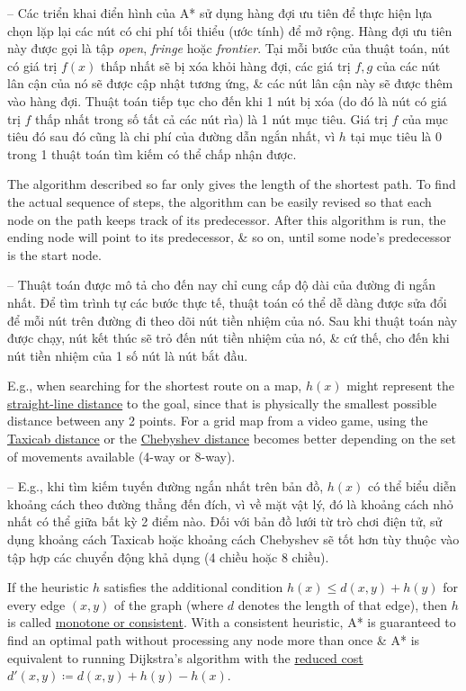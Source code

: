 \documentclass{article}
\begin{document}
-- Các triển khai điển hình của A* sử dụng hàng đợi ưu tiên để thực hiện lựa chọn lặp lại các nút có chi phí tối thiểu (ước tính) để mở rộng. Hàng đợi ưu tiên này được gọi là tập {\it open}, {\it fringe} hoặc {\it frontier}. Tại mỗi bước của thuật toán, nút có giá trị $f(x)$ thấp nhất sẽ bị xóa khỏi hàng đợi, các giá trị $f,g$ của các nút lân cận của nó sẽ được cập nhật tương ứng, \& các nút lân cận này sẽ được thêm vào hàng đợi. Thuật toán tiếp tục cho đến khi 1 nút bị xóa (do đó là nút có giá trị $f$ thấp nhất trong số tất cả các nút rìa) là 1 nút mục tiêu. Giá trị $f$ của mục tiêu đó sau đó cũng là chi phí của đường dẫn ngắn nhất, vì $h$ tại mục tiêu là 0 trong 1 thuật toán tìm kiếm có thể chấp nhận được.

The algorithm described so far only gives the length of the shortest path. To find the actual sequence of steps, the algorithm can be easily revised so that each node on the path keeps track of its predecessor. After this algorithm is run, the ending node will point to its predecessor, \& so on, until some node's predecessor is the start node.

-- Thuật toán được mô tả cho đến nay chỉ cung cấp độ dài của đường đi ngắn nhất. Để tìm trình tự các bước thực tế, thuật toán có thể dễ dàng được sửa đổi để mỗi nút trên đường đi theo dõi nút tiền nhiệm của nó. Sau khi thuật toán này được chạy, nút kết thúc sẽ trỏ đến nút tiền nhiệm của nó, \& cứ thế, cho đến khi nút tiền nhiệm của 1 số nút là nút bắt đầu.

E.g., when searching for the shortest route on a map, $h(x)$ might represent the \href{https://en.wikipedia.org/wiki/Euclidean_distance}{straight-line distance} to the goal, since that is physically the smallest possible distance between any 2 points. For a grid map from a video game, using the \href{https://en.wikipedia.org/wiki/Taxicab_distance}{Taxicab distance} or the \href{https://en.wikipedia.org/wiki/Chebyshev_distance}{Chebyshev distance} becomes better depending on the set of movements available (4-way or 8-way).

-- E.g., khi tìm kiếm tuyến đường ngắn nhất trên bản đồ, $h(x)$ có thể biểu diễn khoảng cách theo đường thẳng đến đích, vì về mặt vật lý, đó là khoảng cách nhỏ nhất có thể giữa bất kỳ 2 điểm nào. Đối với bản đồ lưới từ trò chơi điện tử, sử dụng khoảng cách Taxicab hoặc khoảng cách Chebyshev sẽ tốt hơn tùy thuộc vào tập hợp các chuyển động khả dụng (4 chiều hoặc 8 chiều).

If the heuristic $h$ satisfies the additional condition $h(x)\le d(x,y) + h(y)$ for every edge $(x,y)$ of the graph (where $d$ denotes the length of that edge), then $h$ is called \href{https://en.wikipedia.org/wiki/Consistent_heuristic}{monotone or consistent}. With a consistent heuristic, A* is guaranteed to find an optimal path without processing any node more than once \& A* is equivalent to running Dijkstra's algorithm with the \href{https://en.wikipedia.org/wiki/Reduced_cost}{reduced cost} $d'(x,y)\coloneqq d(x,y) + h(y) - h(x)$.
\end{document}

